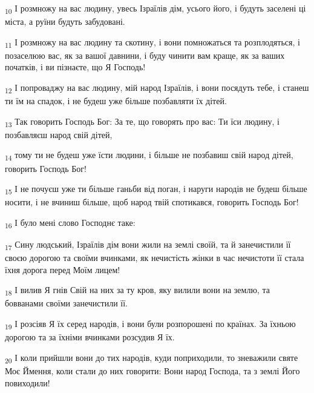 \begin{tcolorbox}
\textsubscript{10} І розмножу на вас людину, увесь Ізраїлів дім, усього його, і будуть заселені ці міста, а руїни будуть забудовані.
\end{tcolorbox}
\begin{tcolorbox}
\textsubscript{11} І розмножу на вас людину та скотину, і вони помножаться та розплодяться, і позаселюю вас, як за вашої давнини, і буду чинити вам краще, як за ваших початків, і ви пізнаєте, що Я Господь!
\end{tcolorbox}
\begin{tcolorbox}
\textsubscript{12} І попроваджу на вас людину, мій народ Ізраїлів, і вони посядуть тебе, і станеш ти їм на спадок, і не будеш уже більше позбавляти їх дітей.
\end{tcolorbox}
\begin{tcolorbox}
\textsubscript{13} Так говорить Господь Бог: За те, що говорять про вас: Ти їси людину, і позбавляєш народ свій дітей,
\end{tcolorbox}
\begin{tcolorbox}
\textsubscript{14} тому ти не будеш уже їсти людини, і більше не позбавиш свій народ дітей, говорить Господь Бог!
\end{tcolorbox}
\begin{tcolorbox}
\textsubscript{15} І не почуєш уже ти більше ганьби від поган, і наруги народів не будеш більше носити, і не вчиниш більше, щоб народ твій спотикався, говорить Господь Бог!
\end{tcolorbox}
\begin{tcolorbox}
\textsubscript{16} І було мені слово Господнє таке:
\end{tcolorbox}
\begin{tcolorbox}
\textsubscript{17} Сину людський, Ізраїлів дім вони жили на землі своїй, та й занечистили її своєю дорогою та своїми вчинками, як нечистість жінки в час нечистоти її стала їхня дорога перед Моїм лицем!
\end{tcolorbox}
\begin{tcolorbox}
\textsubscript{18} І вилив Я гнів Свій на них за ту кров, яку вилили вони на землю, та бовванами своїми занечистили її.
\end{tcolorbox}
\begin{tcolorbox}
\textsubscript{19} І розсіяв Я їх серед народів, і вони були розпорошені по країнах. За їхньою дорогою та за їхніми вчинками розсудив Я їх.
\end{tcolorbox}
\begin{tcolorbox}
\textsubscript{20} І коли прийшли вони до тих народів, куди поприходили, то зневажили святе Моє Ймення, коли стали до них говорити: Вони народ Господа, та з землі Його повиходили!
\end{tcolorbox}

